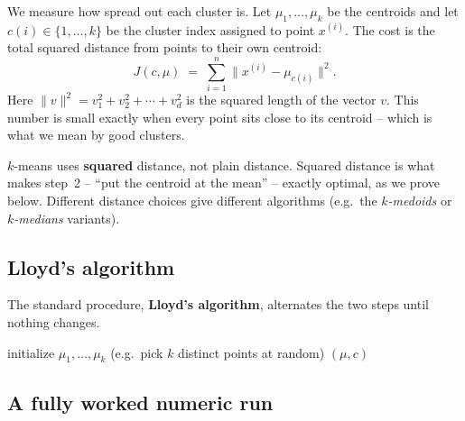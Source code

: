 We measure how spread out each cluster is.
Let $\mu_1,\dots,\mu_k$ be the centroids and let $c(i)\in\{1,\dots,k\}$ be the
cluster index assigned to point $x^{(i)}$. The cost is the total squared
distance from points to their own centroid:
\[
  J(c,\mu) \;=\; \sum_{i=1}^{n} \big\lVert x^{(i)} - \mu_{c(i)} \big\rVert^2 .
\]
Here $\lVert v\rVert^2 = v_1^2 + v_2^2 + \cdots + v_d^2$ is the squared length of
the vector $v$. This number is small exactly when every point sits close to its
centroid -- which is what we mean by good clusters.

\begin{focusbox}
$k$-means uses \textbf{squared} distance, not plain distance. Squared distance is what makes step~2 -- ``put the centroid
at the mean'' -- exactly optimal, as we prove below. Different distance choices
give different algorithms (e.g.\ the \emph{$k$-medoids} or \emph{$k$-medians}
variants).
\end{focusbox}

\subsection{Lloyd's algorithm}

The standard procedure, \textbf{Lloyd's algorithm}, alternates the two
steps until nothing changes.

\begin{algorithm}[H]
\caption{\textsc{$k$-Means} (Lloyd's algorithm)}
initialize $\mu_1,\dots,\mu_k$ (e.g.\ pick $k$ distinct points at random)\;
\Return $(\mu, c)$\;
\end{algorithm}

\subsection{A fully worked numeric run}

